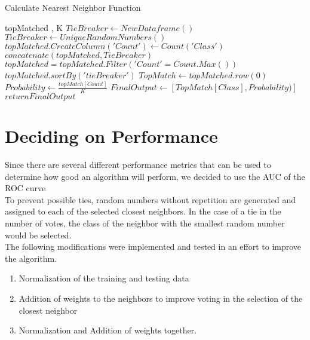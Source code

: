 \documentclass{article}
\begin{document}
\begin{algorithm}[H]
\caption{Calculate Nearest Neighbor Function}
\begin{algorithmic}[1]
\REQUIRE topMatched , K 
	\STATE $TieBreaker \gets NewDataframe()$
	\STATE $TieBreaker \gets UniqueRandomNumbers()$
	\STATE $topMatched.CreateColumn('Count') \gets Count('Class')$
	\STATE $concatenate(topMatched, TieBreaker)$
	\STATE $topMatched = topMatched.Filter( 'Count' = Count.Max())$
	\STATE $topMatched.sortBy('tieBreaker')$
	\STATE $TopMatch \gets topMatched.row(0) $ 
	\STATE $Probability \gets \frac{topMatch[Count]}{ K}$
	\STATE $ FinalOutput \gets [TopMatch[Class], Probability)] $ 
    \STATE $return FinalOutput$
       
\end{algorithmic}
\end{algorithm}



\section{Deciding on Performance}  

Since there are several different performance metrics that can be used to determine how good an algorithm will perform, we decided to use the AUC of the ROC curve \\

To prevent possible ties, random numbers without repetition are generated and assigned to each of the selected closest neighbors. In the case of a tie in the number of votes, the class of the neighbor with the smallest random number would be selected. \\ The following modifications were implemented and tested in an effort to improve the algorithm.
\begin{enumerate}
\item Normalization of the training and testing data
\item Addition of weights to the neighbors to improve voting in the selection of the closest neighbor
\item Normalization and Addition of weights together.
\end{enumerate}
\end{document}
